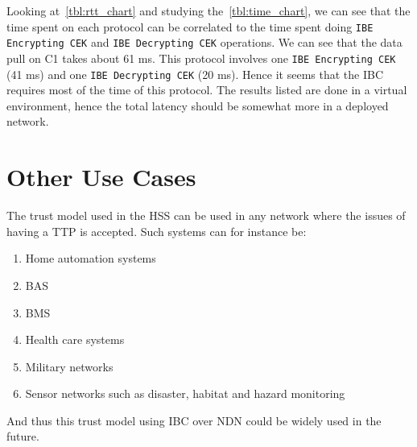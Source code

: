 Looking at~\autoref{tbl:rtt_chart} and studying the~\autoref{tbl:time_chart}, we can see that the time spent on each protocol can be correlated to the time spent doing \texttt{IBE Encrypting \gls{CEK}} and \texttt{IBE Decrypting \gls{CEK}} operations. 
We can see that the data pull on C1 takes about 61 ms.
This protocol involves one \texttt{IBE Encrypting \gls{CEK}} (41 ms) and one \texttt{IBE Decrypting \gls{CEK}} (20 ms). 
Hence it seems that the \gls{IBC} requires most of the time of this protocol.
The results listed are done in a virtual environment, hence the total latency should be somewhat more in a deployed network.

\section{Other Use Cases}
The trust model used in the \gls{HSS} can be used in any network where the issues of having a \gls{TTP} is accepted. 
Such systems can for instance be:
\begin{enumerate}
	\item Home automation systems
	\item \gls{BAS}
	\item \gls{BMS}
	\item Health care systems
	\item Military networks
	\item Sensor networks such as disaster, habitat and hazard monitoring
\end{enumerate}

And thus this trust model using \gls{IBC} over \gls{NDN} could be widely used in the future.